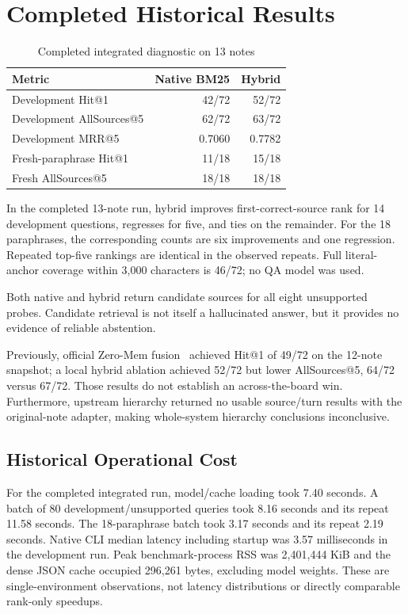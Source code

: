 \documentclass[conference]{IEEEtran}
\begin{document}
\section{Completed Historical Results}
\begin{table}[t]
\caption{Completed integrated diagnostic on 13 notes}
\label{tab:historical}
\centering\small
\begin{tabular}{@{}lrr@{}}
\toprule
Metric & Native BM25 & Hybrid \\
\midrule
Development Hit@1 & 42/72 & 52/72 \\
Development AllSources@5 & 62/72 & 63/72 \\
Development MRR@5 & 0.7060 & 0.7782 \\
Fresh-paraphrase Hit@1 & 11/18 & 15/18 \\
Fresh AllSources@5 & 18/18 & 18/18 \\
\bottomrule
\end{tabular}
\end{table}

In the completed 13-note run, hybrid improves first-correct-source rank for 14 development questions, regresses for five, and ties on the remainder. For the 18 paraphrases, the corresponding counts are six improvements and one regression. Repeated top-five rankings are identical in the observed repeats. Full literal-anchor coverage within 3,000 characters is 46/72; no QA model was used.

Both native and hybrid return candidate sources for all eight unsupported probes. Candidate retrieval is not itself a hallucinated answer, but it provides no evidence of reliable abstention.

Previously, official Zero-Mem fusion~\cite{zeromem} achieved Hit@1 of 49/72 on the 12-note snapshot; a local hybrid ablation achieved 52/72 but lower AllSources@5, 64/72 versus 67/72. Those results do not establish an across-the-board win. Furthermore, upstream hierarchy returned no usable source/turn results with the original-note adapter, making whole-system hierarchy conclusions inconclusive.

\subsection{Historical Operational Cost}
For the completed integrated run, model/cache loading took 7.40 seconds. A batch of 80 development/unsupported queries took 8.16 seconds and its repeat 11.58 seconds. The 18-paraphrase batch took 3.17 seconds and its repeat 2.19 seconds. Native CLI median latency including startup was 3.57 milliseconds in the development run. Peak benchmark-process RSS was 2,401,444 KiB and the dense JSON cache occupied 296,261 bytes, excluding model weights. These are single-environment observations, not latency distributions or directly comparable rank-only speedups.
\end{document}
